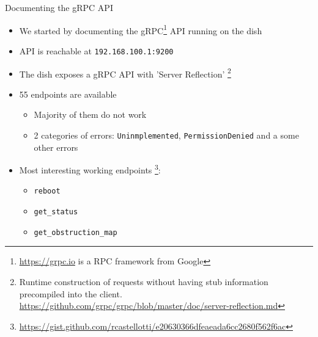 \documentclass[NET,english,beameralt]{tumbeamer}
\renewcommand\emph[1]{\textcolor{TUMBlue}{#1}}
\begin{document}
\begin{frame}{Documenting the gRPC API}
    \begin{itemize}
        \item We started by documenting the gRPC\footnote{\url{https://grpc.io} is a RPC framework from Google} API
              running on the dish
        \item API is reachable at \texttt{192.168.100.1:9200}
        \item The dish exposes a gRPC API with \emph{'Server Reflection'} \footnote{Runtime construction of requests
              without having stub information precompiled into the client.
              \url{https://github.com/grpc/grpc/blob/master/doc/server-reflection.md}}
        \item 55 endpoints are available
            \begin{itemize}
                \item Majority of them do not work
                \item 2 categories of errors: \texttt{Uninmplemented}, \texttt{PermissionDenied} and a some other errors 
            \end{itemize}
        \item Most interesting working endpoints \footnote{\url{https://gist.github.com/rcastellotti/e20630366dfeaeada6cc2680f562f6ac}}: 
            \begin{itemize}
                \item \texttt{reboot}
                \item \texttt{get\_status}
                \item \texttt{get\_obstruction\_map}
            \end{itemize}
    \end{itemize}
\end{frame}
\end{document}
